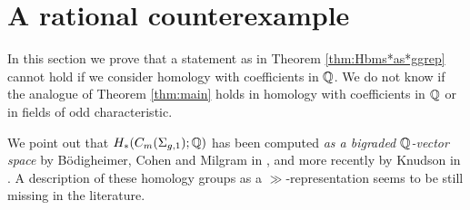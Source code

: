 \section{A rational counterexample}
\label{sec:rational}
In this section we prove that a statement as in Theorem \ref{thm:Hbms*as*ggrep}
cannot hold if we consider homology with coefficients in $\mathbb{Q}$. We do not know
if the analogue of Theorem \ref{thm:main} holds in homology with coefficients in $\mathbb{Q}$
or in fields of odd characteristic.

We point out that $H_*(C_m(\Sigma_{g,1});\mathbb{Q})$ has been computed \emph{as a bigraded $\mathbb{Q}$-vector space}
by B\"odigheimer, Cohen and Milgram in \cite{BCM}, and more recently by Knudson in \cite{Knudson}. A description of
these homology groups as a
$\gg$-representation seems to be still missing in the literature.

